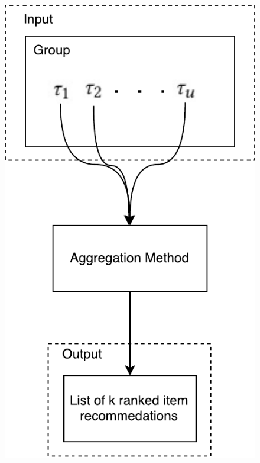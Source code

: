 \begin{frame}
\begin{columns}
\begin{column}{0.5\textwidth}
\begin{figure}
		\includegraphics[scale=.4]{graphics/setuptransposed}
		\end{figure}
		\end{column}
\end{columns}
\end{frame}

%
